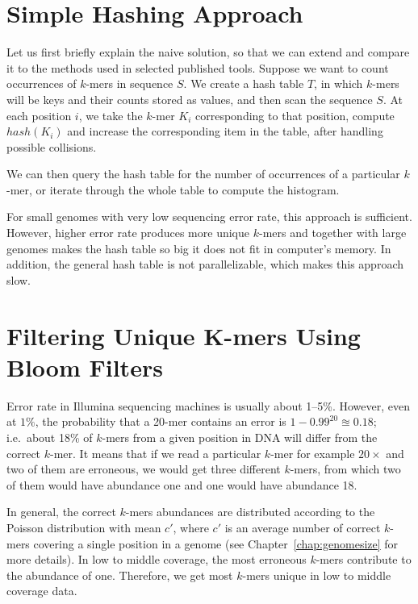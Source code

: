 \section{Simple Hashing Approach}

Let us first briefly explain the naive solution, so that we can extend and compare it to the methods used in selected published tools.
Suppose we want to count occurrences of $k$-mers in sequence $S$.
We create a hash table $T$, in which $k$-mers will be keys and their counts stored as values, and then scan the sequence $S$.
At each position $i$, we take the $k$-mer $K_i$ corresponding to that  position, compute $hash(K_i)$ and increase the corresponding item in the table, after handling possible collisions.

We can then query the hash table for the number of occurrences of a particular $k$-mer, or iterate through the whole table to compute the histogram.

For small genomes with very low sequencing error rate, this approach is sufficient. However, higher error rate produces more unique $k$-mers and together with large genomes makes the hash table so big it does not fit in computer's memory. In addition, the general hash table is not parallelizable, which makes this approach slow.

\section[Filtering Unique K-mers]{Filtering Unique K-mers Using Bloom Filters}

Error rate in Illumina sequencing machines is usually about 1--5\%. However, even at $1\%$, the probability that a 20-mer contains an error is $1 - 0.99^{20} \approxeq 0.18$; i.e.\ about 18\% of $k$-mers from a given position in DNA will differ from the correct $k$-mer. It means that if we read a particular $k$-mer for example $20\times$ and two of them are erroneous, we would get three different $k$-mers, from which two of them would have abundance one and one would have abundance 18.

In general, the correct $k$-mers abundances are distributed according to the Poisson distribution with mean $c'$, where $c'$ is an average number of correct $k$-mers covering a single position in a genome (see Chapter~\ref{chap:genomesize} for more details). In low to middle coverage, the most erroneous $k$-mers contribute to the abundance of one.
Therefore, we get most $k$-mers unique in low to middle coverage data.

